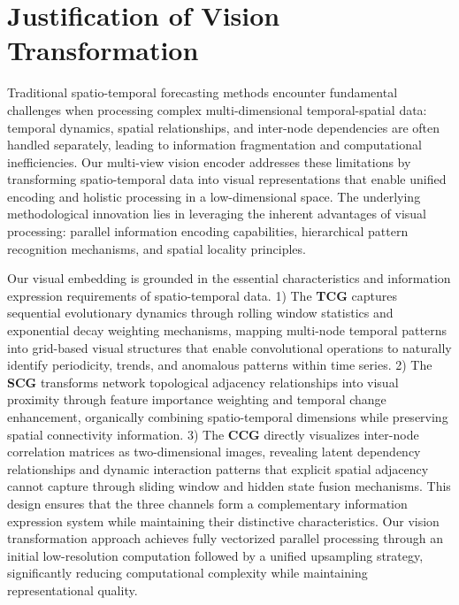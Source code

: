 \section{Justification of Vision Transformation}

Traditional spatio-temporal forecasting methods encounter fundamental challenges when processing complex multi-dimensional temporal-spatial data: temporal dynamics, spatial relationships, and inter-node dependencies are often handled separately, leading to information fragmentation and computational inefficiencies. Our multi-view vision encoder addresses these limitations by transforming spatio-temporal data into visual representations that enable unified encoding and holistic processing in a low-dimensional space. The underlying methodological innovation lies in leveraging the inherent advantages of visual processing: parallel information encoding capabilities, hierarchical pattern recognition mechanisms, and spatial locality principles.

Our visual embedding is grounded in the essential characteristics and information expression requirements of spatio-temporal data. 
1) The \textbf{TCG} captures sequential evolutionary dynamics through rolling window statistics and exponential decay weighting mechanisms, mapping multi-node temporal patterns into grid-based visual structures that enable convolutional operations to naturally identify periodicity, trends, and anomalous patterns within time series. 
2) The \textbf{SCG} transforms network topological adjacency relationships into visual proximity through feature importance weighting and temporal change enhancement, organically combining spatio-temporal dimensions while preserving spatial connectivity information. 
3) The \textbf{CCG} directly visualizes inter-node correlation matrices as two-dimensional images, revealing latent dependency relationships and dynamic interaction patterns that explicit spatial adjacency cannot capture through sliding window and hidden state fusion mechanisms. This design ensures that the three channels form a complementary information expression system while maintaining their distinctive characteristics.
Our vision transformation approach achieves fully vectorized parallel processing through an initial low-resolution computation followed by a unified upsampling strategy, significantly reducing computational complexity while maintaining representational quality.

